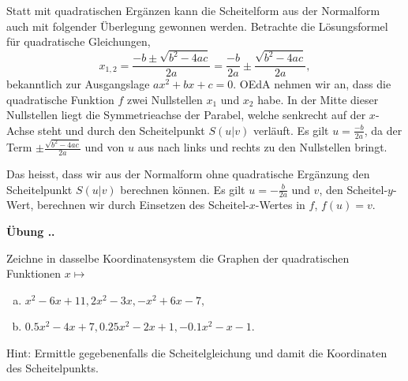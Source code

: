 \documentclass[%
11pt,%
twoside,%
titlepage,%
german,%
headsepline%
]{scrartcl}
\newcommand{\faEyeLightGray}{\textcolor{lightgray}{\faEye}} %
\newcommand{\concatueb}[1]{ueb:#1}%
\newcommand{\concatlsg}[1]{lsg:#1}%
\newcounter{uebcounter}[section]
\renewcommand{\theuebcounter}{\thesection.\arabic{uebcounter}}  %
\newenvironment{uebenv}[1]{%
    \refstepcounter{uebcounter}
    \par\noindent\textbf{Übung \theuebcounter.}%
    \label{\concatueb{#1}}\hfill\hyperref[\concatlsg{#1}]{\faEyeLightGray}\par
}{%
    \par
}
\begin{document}
\begin{bem}
    Statt mit quadratischen Ergänzen kann die Scheitelform aus der Normalform auch mit folgender Überlegung gewonnen werden. Betrachte die Lösungsformel für quadratische Gleichungen,
    $$x_{1,2}=\frac{-b\pm\sqrt{b^2-4ac}}{2a}=\frac{-b}{2a}\pm\frac{\sqrt{b^2-4ac}}{2a},$$
    bekanntlich zur Ausgangslage $ax^2+bx+c=0$. OEdA nehmen wir an, dass die quadratische Funktion $f$ zwei Nullstellen $x_1$ und $x_2$ habe. In der Mitte dieser Nullstellen liegt die Symmetrieachse der Parabel, welche senkrecht auf der $x$-Achse steht und durch den Scheitelpunkt $S(u|v)$ verläuft. Es gilt $u=\frac{-b}{2a}$, da der Term $\pm\frac{\sqrt{b^2-4ac}}{2a}$ und von $u$ aus nach links und rechts zu den Nullstellen bringt.

\begin{center}
\end{center}

    Das heisst, dass wir aus der Normalform ohne quadratische Ergänzung den Scheitelpunkt $S(u|v)$ berechnen können. Es gilt $u=-\frac{b}{2a}$ und $v$, den Scheitel-$y$-Wert, berechnen wir durch Einsetzen des Scheitel-$x$-Wertes in $f$, $f(u)=v$.
\end{bem}

\begin{uebenv}{scheitelform}
    Zeichne
in dasselbe Koordinatensystem die Graphen der quadratischen Funktionen $x\mapsto$
\begin{enumerate}[a)]
\item $x^2-6x+11, 2x^2-3x, -x^2+6x-7,$
\item $0.5x^2-4x+7, 0.25x^2-2x+1, -0.1x^2-x-1.$
\end{enumerate}
Hint: Ermittle gegebenenfalls die Scheitelgleichung und damit die Koordinaten des Scheitelpunkts.
\end{uebenv}
\end{document}
